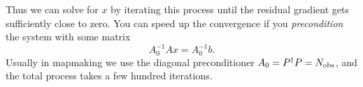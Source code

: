 \begin{subappendices}
Thus we can solve for $x$ by iterating this process until the residual gradient gets sufficiently close to zero.  You can speed up the convergence if you \textit{precondition} the system with some matrix
\begin{equation}
  A_0^{-1} A x = A_0^{-1} b.
\end{equation}
Usually in mapmaking we use the diagonal preconditioner $A_0 = P^\dag P = N_{\rm obs}$, and the total process takes a few hundred iterations.



  
\end{subappendices}


